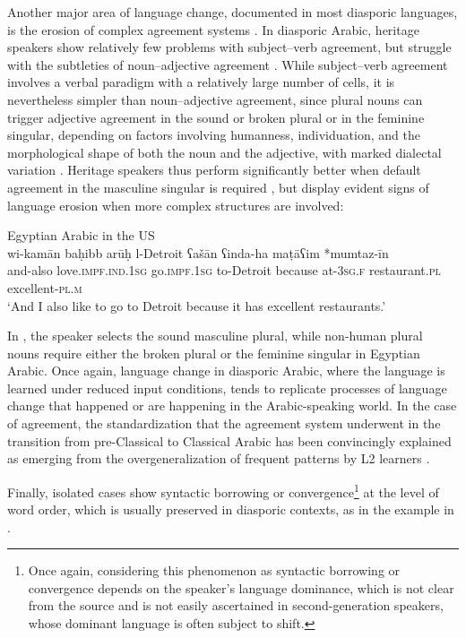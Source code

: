 \documentclass[output=paper]{langsci/langscibook}
\begin{document}
Another major area of language change, documented in most diasporic languages, is the erosion of complex agreement systems \citep[192]{GonzoSaltarelli1983}. In diasporic Arabic, heritage speakers show relatively few problems with subject–verb agreement, but struggle with the subtleties of noun–adjective agreement \citep[8]{AlbiriniChakrani2013}. While subject--verb agreement involves a verbal paradigm with a relatively large number of cells, it is nevertheless simpler than noun–adjective agreement, since plural nouns can trigger adjective agreement in the sound or broken plural or in the feminine singular, depending on factors involving humanness, individuation, and the morphological shape of both the noun and the adjective, with marked dialectal variation \citep[103–104]{Danna2017article}. Heritage speakers thus perform significantly better when default agreement in the masculine singular is required \citep[8]{AlbiriniChakrani2013}, but display evident signs of language erosion when more complex structures are involved: 

\ea\label{ex:key:usa}
{Egyptian Arabic in the US \citep[740]{Albirini2014}}\\
\gll wi-kamān baḥibb arūḥ l-Detroit ʕašān ʕinda-ha maṭāʕim *mumtaz-īn\\
     and-also love.\textsc{impf.ind.1sg} go.\textsc{impf.1sg} to-Detroit because at-\textsc{3sg.f} restaurant.\textsc{pl} excellent-\textsc{pl.m}\\
\glt `And I also like to go to Detroit because it has excellent restaurants.'
\z

In , the speaker selects the sound masculine plural, while non-human plural nouns require either the broken plural or the feminine singular in Egyptian Arabic. Once again, language change in diasporic Arabic, where the language is learned under reduced input conditions, tends to replicate processes of language change that happened or are happening in the Arabic-speaking world. In the case of agreement, the standardization that the agreement system underwent in the transition from pre-Classical to Classical Arabic has been convincingly explained as emerging from the overgeneralization of frequent patterns by L2 learners \citep{Belnap1999}.

Finally, isolated cases show syntactic borrowing or convergence\footnote{Once again, considering this phenomenon as syntactic borrowing or convergence depends on the speaker’s language dominance, which is not clear from the source and is not easily ascertained in second-generation speakers, whose dominant language is often subject to shift.} at the level of word order, which is usually preserved in diasporic contexts, as in the example in .
\end{document}

